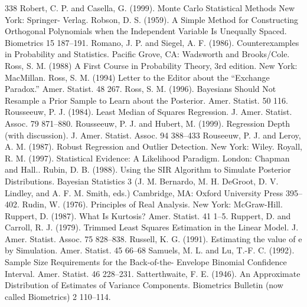 \begin{thebibliography}{338}
\label{bib:source256} Robert, C. P. and Casella, G. (1999). Monte Carlo Statistical Methods New York: Springer- Verlag.
\label{bib:source257} Robson, D. S. (1959). A Simple Method for Constructing Orthogonal Polynomials when the Independent Variable Is Unequally Spaced. Biometrics 15 187–191.
\label{bib:source258} Romano, J. P. and Siegel, A. F. (1986). Counterexamples in Probability and Statistics. Pacific Grove, CA: Wadsworth and Brooks/Cole.
\label{bib:source259} Ross, S. M. (1988) A First Course in Probability Theory, 3rd edition. New York: MacMillan.
\label{bib:source260} Ross, S. M. (1994) Letter to the Editor about the “Exchange Paradox.” Amer. Statist. 48 267.
\label{bib:source261} Ross, S. M. (1996). Bayesians Should Not Resample a Prior Sample to Learn about the Posterior. Amer. Statist. 50 116.
\label{bib:source262} Rousseeuw, P. J. (1984). Least Median of Squares Regression. J. Amer. Statist. Assoc. 79 871–880.
\label{bib:source263} Rousseeuw, P. J. and Hubert, M. (1999). Regression Depth (with discussion). J. Amer. Statist. Assoc. 94 388–433
\label{bib:source264} Rouseeuw, P. J. and Leroy, A. M. (1987). Robust Regression and Outlier Detection. New York: Wiley.
\label{bib:source265} Royall, R. M. (1997). Statistical Evidence: A Likelihood Paradigm. London: Chapman and Hall..
\label{bib:source266} Rubin, D. B. (1988). Using the SIR Algorithm to Simulate Posterior Distributions. Bayesian Statistics 3 (J. M. Bernardo, M. H. DeGroot, D. V. Lindley, and A. F. M. Smith, eds.) Cambridge, MA: Oxford University Press 395–402.
\label{bib:source267} Rudin, W. (1976). Principles of Real Analysis. New York: McGraw-Hill.
\label{bib:source268} Ruppert, D. (1987). What Is Kurtosis? Amer. Statist. 41 1–5.
\label{bib:source269} Ruppert, D. and Carroll, R. J. (1979). Trimmed Least Squares Estimation in the Linear Model. J. Amer. Statist. Assoc. 75 828–838.
\label{bib:source270} Russell, K. G. (1991). Estimating the value of e by Simulation. Amer. Statist. 45 66–68
\label{bib:source271} Samuels, M. L. and Lu, T.-F. C. (1992). Sample Size Requirements for the Back-of-the- Envelope Binomial Confidence Interval. Amer. Statist. 46 228–231.
\label{bib:source272} Satterthwaite, F. E. (1946). An Approximate Distribution of Estimates of Variance Components. Biometrics Bulletin (now called Biometrics) 2 110–114.

\end{thebibliography}
